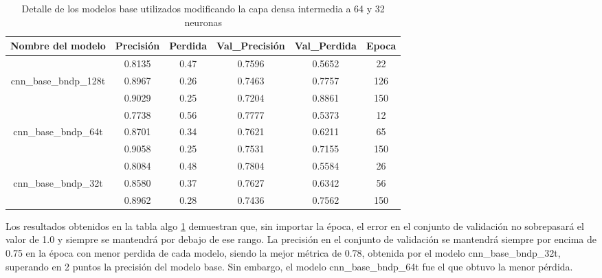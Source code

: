 \begin{table}[!ht]
	\centering
	\begin{tabular}{|c|c|c|c|c|c|}
		\hline
		\textbf{Nombre del modelo} & \textbf{Precisión} & \textbf{Perdida} & \textbf{Val\_Precisión} & \textbf{Val\_Perdida} & \textbf{Epoca} \\ \hline
		~ & 0.8135 & 0.47 & 0.7596 & 0.5652 & 22 \\ \cline{2-6}
		cnn\_base\_bndp\_128t & 0.8967 & 0.26 & 0.7463 & 0.7757 & 126 \\ \cline{2-6}
		~ & 0.9029 & 0.25 & 0.7204 & 0.8861 & 150 \\ \hline
		~ & 0.7738 & 0.56 & 0.7777 & 0.5373 & 12 \\ \cline{2-6}
		cnn\_base\_bndp\_64t & 0.8701 & 0.34 & 0.7621 & 0.6211 & 65 \\ \cline{2-6}
		~ & 0.9058 & 0.25 & 0.7531 & 0.7155 & 150 \\ \hline
		~ & 0.8084 & 0.48 & 0.7804 & 0.5584 & 26 \\ \cline{2-6}
		cnn\_base\_bndp\_32t & 0.8580 & 0.37 & 0.7627 & 0.6342 & 56 \\ \cline{2-6}
		~ & 0.8962 & 0.28 & 0.7436 & 0.7562 & 150 \\ \hline
	\end{tabular}
	\caption{Detalle de los modelos base utilizados modificando la capa densa intermedia a 64 y 32 neuronas}
	\label{tbl:8}
\end{table}

Los resultados obtenidos en la tabla algo \ref{tbl:8} demuestran que, sin importar la época, el error en el conjunto de validación no sobrepasará el valor de 1.0 y siempre se mantendrá por debajo de ese rango. La precisión en el conjunto de validación se mantendrá siempre por encima de 0.75 en la época con menor perdida de cada modelo, siendo la mejor métrica de 0.78, obtenida por el modelo cnn\_base\_bndp\_32t, superando en 2 puntos la precisión del modelo base. Sin embargo, el modelo cnn\_base\_bndp\_64t fue el que obtuvo la menor pérdida.


